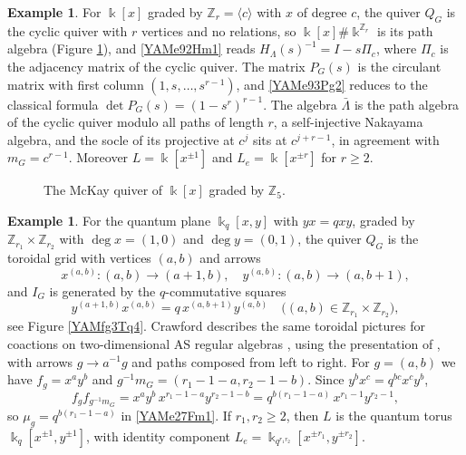 \documentclass[reqno]{amsart}
\numberwithin{equation}{section}
\theoremstyle{definition}
\newtheorem{example}[equation]{Example}
\theoremstyle{remark}
\theoremstyle{plain}
\newcommand{\kk}{\Bbbk}
\begin{document}
\begin{example}\label{YAMex19Qd9}
For $\kk[x]$ graded by $\mathbb Z_r=\langle c\rangle$ with $x$ of degree $c$, the quiver $Q_G$ is the cyclic quiver with $r$ vertices and no relations, so $\kk[x]\#\kk^{\mathbb Z_r}$ is its path algebra (Figure \ref{YAMfg1Cy2}), and \eqref{YAMe92Hm1} reads $H_\Lambda(s)^{-1}=I-s\Pi_c$, where $\Pi_c$ is the adjacency matrix of the cyclic quiver. The matrix $P_G(s)$ is the circulant matrix with first column $(1,s,\dots,s^{r-1})$, and \eqref{YAMe93Pg2} reduces to the classical formula $\det P_G(s)=(1-s^r)^{r-1}$. The algebra $\bar\Lambda$ is the path algebra of the cyclic quiver modulo all paths of length $r$, a self-injective Nakayama algebra, and the socle of its projective at $c^j$ sits at $c^{j+r-1}$, in agreement with $m_G=c^{r-1}$. Moreover $L=\kk[x^{\pm1}]$ and $L_e=\kk[x^{\pm r}]$ for $r\ge2$.
\end{example}

\begin{figure}[H]
\centering
{}
\caption{The McKay quiver of $\kk[x]$ graded by $\mathbb Z_5$.}
\label{YAMfg1Cy2}
\end{figure}

\begin{example}\label{YAMex19Qd8}
For the quantum plane $\kk_q[x,y]$ with $yx=qxy$, graded by $\mathbb Z_{r_1}\times\mathbb Z_{r_2}$ with $\deg x=(1,0)$ and $\deg y=(0,1)$, the quiver $Q_G$ is the toroidal grid with vertices $(a,b)$ and arrows
\[
x^{(a,b)}\colon(a,b)\to(a+1,b),\quad y^{(a,b)}\colon(a,b)\to(a,b+1),
\]
and $I_G$ is generated by the $q$-commutative squares
\[
y^{(a+1,b)}x^{(a,b)}=q\,x^{(a,b+1)}y^{(a,b)}\quad\big((a,b)\in\mathbb Z_{r_1}\times\mathbb Z_{r_2}\big),
\]
see Figure \ref{YAMfg3Tq4}. Crawford describes the same toroidal pictures for coactions on two-dimensional AS regular algebras \cite[Section 4]{Cra1}, using the presentation of \cite[Theorem 2.6]{Cra1}, with arrows $g\to a^{-1}g$ and paths composed from left to right. For $g=(a,b)$ we have $f_g=x^ay^b$ and $g^{-1}m_G=(r_1-1-a,r_2-1-b)$. Since $y^bx^c=q^{bc}x^cy^b$,
\[
f_gf_{g^{-1}m_G}=x^ay^b\,x^{r_1-1-a}y^{r_2-1-b}=q^{b(r_1-1-a)}\,x^{r_1-1}y^{r_2-1},
\]
so $\mu_g=q^{b(r_1-1-a)}$ in \eqref{YAMe27Fm1}. If $r_1,r_2\ge2$, then $L$ is the quantum torus $\kk_q[x^{\pm1},y^{\pm1}]$, with identity component $L_e=\kk_{q^{r_1r_2}}[x^{\pm r_1},y^{\pm r_2}]$.
\end{example}
\end{document}
